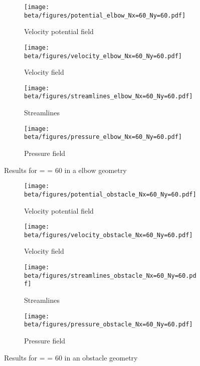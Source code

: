 \newpage

\begin{figure}[htbp]
      \centering
      \begin{subfigure}{.45\textwidth}
            \texttt{[image: beta/figures/potential\_elbow\_Nx=60\_Ny=60.pdf]}
            \caption{Velocity potential field}\label{fig:vel_pot_field_el}
      \end{subfigure}
      \begin{subfigure}{.45\textwidth}
            \texttt{[image: beta/figures/velocity\_elbow\_Nx=60\_Ny=60.pdf]}
            \caption{Velocity field}\label{fig:velocity_field_el}
      \end{subfigure}

      \centering
      \begin{subfigure}{.45\textwidth}
            \texttt{[image: beta/figures/streamlines\_elbow\_Nx=60\_Ny=60.pdf]}
            \caption{Streamlines}\label{fig:streamlines_el}
      \end{subfigure}
      \begin{subfigure}{.45\textwidth}
            \texttt{[image: beta/figures/pressure\_elbow\_Nx=60\_Ny=60.pdf]}
            \caption{Pressure field}\label{fig:pressure_field_el}
      \end{subfigure}
      \caption{Results for  =  = \num{60} in a elbow geometry}
\end{figure}

\newpage

\begin{figure}[htbp]
      \centering
      \begin{subfigure}{.45\textwidth}
            \texttt{[image: beta/figures/potential\_obstacle\_Nx=60\_Ny=60.pdf]}
            \caption{Velocity potential field}\label{fig:vel_pot_field_ob}
      \end{subfigure}
      \begin{subfigure}{.45\textwidth}
            \texttt{[image: beta/figures/velocity\_obstacle\_Nx=60\_Ny=60.pdf]}
            \caption{Velocity field}\label{fig:velocity_field_ob}
      \end{subfigure}

      \centering
      \begin{subfigure}{.45\textwidth}
            \texttt{[image: beta/figures/streamlines\_obstacle\_Nx=60\_Ny=60.pdf]}
            \caption{Streamlines}\label{fig:streamlines_ob}
      \end{subfigure}
      \begin{subfigure}{.45\textwidth}
            \texttt{[image: beta/figures/pressure\_obstacle\_Nx=60\_Ny=60.pdf]}
            \caption{Pressure field}\label{fig:pressure_field_ob}
      \end{subfigure}
      \caption{Results for  =  = \num{60} in an obstacle geometry}
\end{figure}
